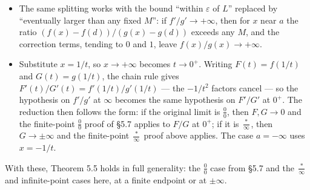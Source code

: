 \documentclass[a4paper,12pt,oneside]{memoir}
\begin{document}
\begin{itemize}
  \item {} The same splitting works with the bound “within \(\varepsilon\) of \(L\)” replaced by “eventually larger than any fixed \(M\)”: if \(f'/g' \to +\infty\), then for \(x\) near \(a\) the ratio \((f(x)-f(d))/(g(x)-g(d))\) exceeds any \(M\), and the correction terms, tending to \(0\) and \(1\), leave \(f(x)/g(x) \to +\infty\).
  \item {} Substitute \(x = 1/t\), so \(x \to +\infty\) becomes \(t \to 0^{+}\). Writing \(F(t) = f(1/t)\) and \(G(t) = g(1/t)\), the chain rule gives \(F'(t)/G'(t) = f'(1/t)/g'(1/t)\) — the \(-1/t^{2}\) factors cancel — so the hypothesis on \(f'/g'\) at \(\infty\) becomes the same hypothesis on \(F'/G'\) at \(0^{+}\). The reduction then follows the form: if the original limit is \(\tfrac{0}{0}\), then \(F, G \to 0\) and the finite-point \(\tfrac{0}{0}\) proof of §5.7 applies to \(F/G\) at \(0^{+}\); if it is \(\tfrac{\ast}{\infty}\), then \(G \to \pm\infty\) and the finite-point \(\tfrac{\ast}{\infty}\) proof above applies. The case \(a = -\infty\) uses \(x = -1/t\).
\end{itemize}
With these, Theorem 5.5 holds in full generality: the \(\tfrac{0}{0}\) case from §5.7 and the \(\tfrac{\ast}{\infty}\) and infinite-point cases here, at a finite endpoint or at \(\pm\infty\).
\end{document}

